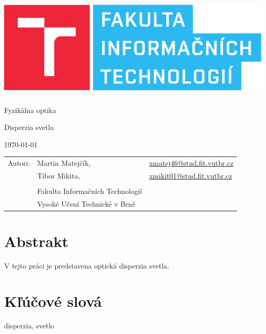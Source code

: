 \documentclass[12pt,a4paper,titlepage,final]{book}
\makeatletter
\newcommand\Course{Fyzikálna optika}
\newcommand\WorkTitle{Disperzia svetla}
\newcommand\AuthorA{Martin Matejčík}
\newcommand\AuthorAEmail{xmatej46@stud.fit.vutbr.cz}
\newcommand\AuthorB{Tibor Mikita}
\newcommand\AuthorBEmail{xmikit01@stud.fit.vutbr.cz}
\newcommand\Faculty{Fakulta Informačních Technologií}
\newcommand\School{Vysoké Učení Technické v Brně}
\makeatother
\begin{document}
	\begin{titlepage}
	\begin{center}
		\includegraphics[height=5cm]{images/logo.pdf}
	\end{center}
	\vfill
	\begin{center}
		\begin{Large}
			\Course\\
		\end{Large}
		\bigskip
		\begin{Huge}
			\WorkTitle\\
		\end{Huge}
	\end{center}
	\vfill
	\begin{center}
		\begin{large}
			\today
		\end{large}
	\end{center}
	\vfill
	\begin{flushleft}
		\begin{large}
			\begin{tabular}{lll}
				Autori: & \AuthorA, & \url{\AuthorAEmail} \\
				        & \AuthorB, & \url{\AuthorBEmail} \\
				& & \\
				& \Faculty \\
				& \School \\
			\end{tabular}
		\end{large}
	\end{flushleft}
\end{titlepage}		
	
\section*{Abstrakt}
V tejto práci je predstavena optická disperzia svetla.

\section*{Kľúčové slová}
disperzia, svetlo
	
\end{document}

